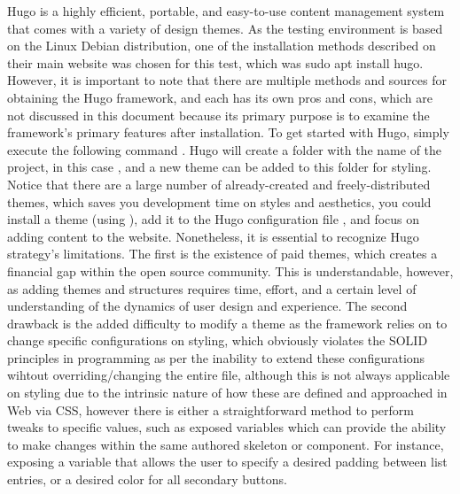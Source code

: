 \markdownRendererDocumentBegin
{}\markdownRendererInterblockSeparator
{}Hugo is a highly efficient, portable, and easy-to-use content management system that comes with a variety of design themes.\markdownRendererInterblockSeparator
{}As the testing environment is based on the Linux Debian distribution, one of the installation methods described on their main website was chosen for this test, which was sudo apt install hugo.\markdownRendererInterblockSeparator
{}However, it is important to note that there are multiple methods and sources for obtaining the Hugo framework, and each has its own pros and cons, which are not discussed in this document because its primary purpose is to examine the framework's primary features after installation.\markdownRendererInterblockSeparator
{}To get started with Hugo, simply execute the following command . Hugo will create a folder with the name of the project, in this case , and a new theme can be added to this folder for styling. Notice that there are a large number of already-created and freely-distributed themes, which saves you development time on styles and aesthetics, you could install a theme (using ), add it to the Hugo configuration file , and focus on adding content to the website.\markdownRendererInterblockSeparator
{}Nonetheless, it is essential to recognize Hugo strategy's limitations. The first is the existence of paid themes, which creates a financial gap within the open source community. This is understandable, however, as adding themes and structures requires time, effort, and a certain level of understanding of the dynamics of user design and experience.\markdownRendererInterblockSeparator
{}The second drawback is the added difficulty to modify a theme as the framework relies on  to change specific configurations on styling, which obviously violates the SOLID principles in programming as per the inability to extend these configurations wihtout overriding/changing the entire file, although this is not always applicable on styling due to the intrinsic nature of how these are defined and approached in Web via CSS, however there is either a straightforward method to perform tweaks to specific values, such as exposed variables which can provide the ability to make changes within the same authored skeleton or component. For instance, exposing a variable that allows the user to specify a desired padding between list entries, or a desired color for all secondary buttons.\markdownRendererDocumentEnd